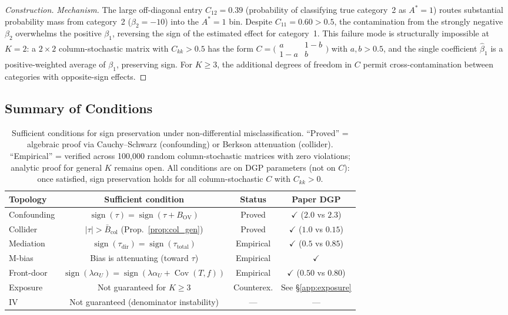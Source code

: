 \begin{proof}[Construction]
\emph{Mechanism.}
The large off-diagonal entry $C_{12}=0.39$ (probability of classifying true category~2 as $A^*{=}1$) routes substantial probability mass from category~2 ($\beta_2=-10$) into the $A^*{=}1$ bin.
Despite $C_{11}=0.60>0.5$, the contamination from the strongly negative $\beta_2$ overwhelms the positive $\beta_1$, reversing the sign of the estimated effect for category~1.
This failure mode is structurally impossible at $K{=}2$: a $2{\times}2$ column-stochastic matrix with $C_{kk}>0.5$ has the form $C=\bigl(\begin{smallmatrix}a&1{-}b\\1{-}a&b\end{smallmatrix}\bigr)$ with $a,b>0.5$, and the single coefficient $\hat\beta_1$ is a positive-weighted average of $\beta_1$, preserving sign.
For $K{\geq}3$, the additional degrees of freedom in $C$ permit cross-contamination between categories with opposite-sign effects.
\end{proof}

\subsection{Summary of Conditions}
\label{app:conditions}

\begin{table}[h]
\centering
\small
\begin{tabular}{lccc}
\toprule
\textbf{Topology} & \textbf{Sufficient condition} & \textbf{Status} & \textbf{Paper DGP} \\
\midrule
Confounding & $\operatorname{sign}(\tau)=\operatorname{sign}(\tau{+}B_{\mathrm{OV}})$ & Proved & $\checkmark$ ($2.0$ vs $2.3$)\\
Collider & $|\tau|>\bar{B}_{\mathrm{col}}$ (Prop.~\ref{prop:col_gen}) & Proved & $\checkmark$ ($1.0$ vs $0.15$)\\
\midrule
Mediation & $\operatorname{sign}(\tau_{\mathrm{dir}})=\operatorname{sign}(\tau_{\mathrm{total}})$ & Empirical & $\checkmark$ ($0.5$ vs $0.85$)\\
M-bias & Bias is attenuating (toward $\tau$) & Empirical & $\checkmark$ \\
Front-door & $\operatorname{sign}(\lambda\alpha_U)=\operatorname{sign}(\lambda\alpha_U{+}\operatorname{Cov}(T,f))$ & Empirical & $\checkmark$ ($0.50$ vs $0.80$)\\
\midrule
Exposure & Not guaranteed for $K\geq 3$ & Counterex. & See §\ref{app:exposure} \\
IV & Not guaranteed (denominator instability) & --- & --- \\
\bottomrule
\end{tabular}
\caption{Sufficient conditions for sign preservation under non-differential misclassification.
``Proved'' = algebraic proof via Cauchy--Schwarz (confounding) or Berkson attenuation (collider).
``Empirical'' = verified across 100{,}000 random column-stochastic matrices with zero violations; analytic proof for general $K$ remains open.
All conditions are on DGP parameters (not on $C$): once satisfied, sign preservation holds for all column-stochastic $C$ with $C_{kk}>0$.}
\label{tab:sign_conditions}
\end{table}

